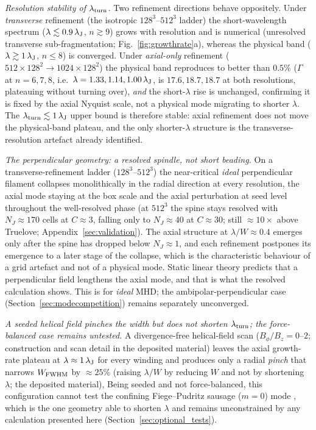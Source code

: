 \documentclass[usenatbib,twoside,twocolumn]{mnras}
\begin{document}
\emph{Resolution stability of $\lambda_{\rm turn}$.} Two refinement directions behave oppositely. Under \emph{transverse} refinement (the isotropic $128^3$--$512^3$ ladder) the short-wavelength spectrum ($\lambda\lesssim0.9\,\lambda_{\rm J}$, $n\gtrsim9$) grows with resolution and is numerical (unresolved transverse sub-fragmentation; Fig.~\ref{fig:growthrate}a), whereas the physical band ($\lambda\gtrsim1\,\lambda_{\rm J}$, $n\leq8$) is converged. Under \emph{axial-only} refinement ($512\times128^2\to1024\times128^2$) the physical band reproduces to better than $0.5\%$ ($\Gamma$ at $n=6,7,8$, i.e.\ $\lambda=1.33,1.14,1.00\,\lambda_{\rm J}$, is $17.6,18.7,18.7$ at both resolutions, plateauing without turning over), \emph{and} the short-$\lambda$ rise is unchanged, confirming it is fixed by the axial Nyquist scale, not a physical mode migrating to shorter $\lambda$. The $\lambda_{\rm turn}\lesssim1\,\lambda_{\rm J}$ upper bound is therefore stable: axial refinement does not move the physical-band plateau, and the only shorter-$\lambda$ structure is the transverse-resolution artefact already identified.

\emph{The perpendicular geometry: a resolved spindle, not short beading.} On a transverse-refinement ladder ($128^3$--$512^3$) the near-critical \emph{ideal} perpendicular filament collapses monolithically in the radial direction at every resolution, the axial mode staying at the box scale and the axial perturbation at seed level throughout the well-resolved phase (at $512^3$ the spine stays resolved with $N_J\approx170$ cells at $C\approx3$, falling only to $N_J\approx40$ at $C\approx30$; still $\approx10\times$ above Truelove; Appendix~\ref{sec:validation}). The axial structure at $\lambda/W\approx0.4$ emerges only after the spine has dropped below $N_J\approx1$, and each refinement postpones its emergence to a later stage of the collapse, which is the characteristic behaviour of a grid artefact and not of a physical mode. Static linear theory predicts that a perpendicular field lengthens the axial mode, and that is what the resolved calculation shows. This is for \emph{ideal} MHD; the ambipolar-perpendicular case (Section~\ref{sec:modecompetition}) remains separately unconverged.

\emph{A seeded helical field pinches the width but does not shorten $\lambda_{\rm turn}$; the force-balanced case remains untested.} A divergence-free helical-field scan ($B_\phi/B_z=0$--$2$; construction and scan detail in the deposited material) leaves the axial growth-rate plateau at $\lambda\approx1\,\lambda_{\rm J}$ for every winding and produces only a radial \emph{pinch} that narrows $W_{\rm FWHM}$ by $\approx25\%$ (raising $\lambda/W$ by reducing $W$ and not by shortening $\lambda$; the deposited material), Being seeded and not force-balanced, this configuration cannot test the confining Fiege--Pudritz sausage ($m=0$) mode \citep{Fiege2000}, which is the one geometry able to shorten $\lambda$ and remains unconstrained by any calculation presented here (Section~\ref{sec:optional_tests}).
\end{document}
